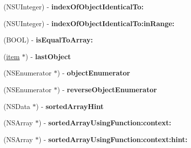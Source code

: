 \begin{DoxyCompactItemize}
\item 
\hypertarget{interfaceget_items_by_batch_response_ad82e8fedab9cff9e254289f2bad49fc0}{}(N\+S\+U\+Integer) -\/ {\bfseries index\+Of\+Object\+Identical\+To\+:}\label{interfaceget_items_by_batch_response_ad82e8fedab9cff9e254289f2bad49fc0}

\item 
\hypertarget{interfaceget_items_by_batch_response_a1008070730549d82d8c6d5c942e957d1}{}(N\+S\+U\+Integer) -\/ {\bfseries index\+Of\+Object\+Identical\+To\+:in\+Range\+:}\label{interfaceget_items_by_batch_response_a1008070730549d82d8c6d5c942e957d1}

\item 
\hypertarget{interfaceget_items_by_batch_response_a63bc71493f6b8946e52801f5763c63bd}{}(B\+O\+O\+L) -\/ {\bfseries is\+Equal\+To\+Array\+:}\label{interfaceget_items_by_batch_response_a63bc71493f6b8946e52801f5763c63bd}

\item 
\hypertarget{interfaceget_items_by_batch_response_acb4cf714c7f4199b8790b67b449179a5}{}(\hyperlink{interfaceitem}{item} $\ast$) -\/ {\bfseries last\+Object}\label{interfaceget_items_by_batch_response_acb4cf714c7f4199b8790b67b449179a5}

\item 
\hypertarget{interfaceget_items_by_batch_response_a985ffc3b2510ea628fba636c95bcf8e1}{}(N\+S\+Enumerator $\ast$) -\/ {\bfseries object\+Enumerator}\label{interfaceget_items_by_batch_response_a985ffc3b2510ea628fba636c95bcf8e1}

\item 
\hypertarget{interfaceget_items_by_batch_response_a5268ef0db980debd5b59d448af1a220d}{}(N\+S\+Enumerator $\ast$) -\/ {\bfseries reverse\+Object\+Enumerator}\label{interfaceget_items_by_batch_response_a5268ef0db980debd5b59d448af1a220d}

\item 
\hypertarget{interfaceget_items_by_batch_response_a5681d72c5919bd3a28c807e7de6507ab}{}(N\+S\+Data $\ast$) -\/ {\bfseries sorted\+Array\+Hint}\label{interfaceget_items_by_batch_response_a5681d72c5919bd3a28c807e7de6507ab}

\item 
\hypertarget{interfaceget_items_by_batch_response_a501f3272476be21021917666d2aa4c0f}{}(N\+S\+Array $\ast$) -\/ {\bfseries sorted\+Array\+Using\+Function\+:context\+:}\label{interfaceget_items_by_batch_response_a501f3272476be21021917666d2aa4c0f}

\item 
\hypertarget{interfaceget_items_by_batch_response_a06f3edd23ba1f0576338069b6593f06c}{}(N\+S\+Array $\ast$) -\/ {\bfseries sorted\+Array\+Using\+Function\+:context\+:hint\+:}\label{interfaceget_items_by_batch_response_a06f3edd23ba1f0576338069b6593f06c}


\end{DoxyCompactItemize}
